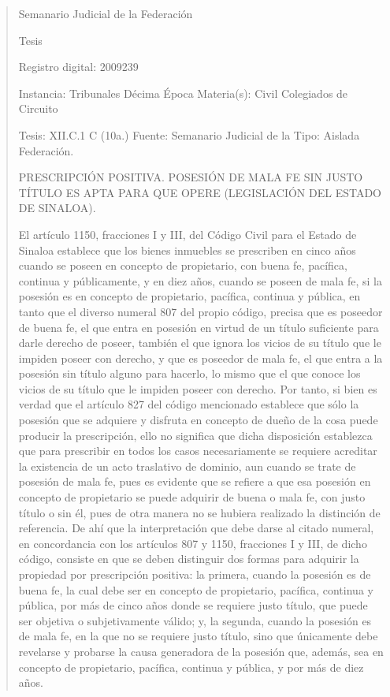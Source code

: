 \documentclass[11pt,a4paper]{article}
\begin{document}
\begin{quote}
                                                   Semanario Judicial de la Federación

                                               Tesis

 Registro digital: 2009239

 Instancia: Tribunales             Décima Época                          Materia(s): Civil
 Colegiados de Circuito

 Tesis: XII.C.1 C (10a.)           Fuente: Semanario Judicial de la      Tipo: Aislada
                                   Federación.


PRESCRIPCIÓN POSITIVA. POSESIÓN DE MALA FE SIN JUSTO TÍTULO ES APTA PARA QUE
OPERE (LEGISLACIÓN DEL ESTADO DE SINALOA).


El artículo 1150, fracciones I y III, del Código Civil para el Estado de Sinaloa establece que los
bienes inmuebles se prescriben en cinco años cuando se poseen en concepto de propietario, con
buena fe, pacífica, continua y públicamente, y en diez años, cuando se poseen de mala fe, si la
posesión es en concepto de propietario, pacífica, continua y pública, en tanto que el diverso numeral
807 del propio código, precisa que es poseedor de buena fe, el que entra en posesión en virtud de
un título suficiente para darle derecho de poseer, también el que ignora los vicios de su título que le
impiden poseer con derecho, y que es poseedor de mala fe, el que entra a la posesión sin título
alguno para hacerlo, lo mismo que el que conoce los vicios de su título que le impiden poseer con
derecho. Por tanto, si bien es verdad que el artículo 827 del código mencionado establece que sólo
la posesión que se adquiere y disfruta en concepto de dueño de la cosa puede producir la
prescripción, ello no significa que dicha disposición establezca que para prescribir en todos los
casos necesariamente se requiere acreditar la existencia de un acto traslativo de dominio, aun
cuando se trate de posesión de mala fe, pues es evidente que se refiere a que esa posesión en
concepto de propietario se puede adquirir de buena o mala fe, con justo título o sin él, pues de otra
manera no se hubiera realizado la distinción de referencia. De ahí que la interpretación que debe
darse al citado numeral, en concordancia con los artículos 807 y 1150, fracciones I y III, de dicho
código, consiste en que se deben distinguir dos formas para adquirir la propiedad por prescripción
positiva: la primera, cuando la posesión es de buena fe, la cual debe ser en concepto de propietario,
pacífica, continua y pública, por más de cinco años donde se requiere justo título, que puede ser
objetiva o subjetivamente válido; y, la segunda, cuando la posesión es de mala fe, en la que no se
requiere justo título, sino que únicamente debe revelarse y probarse la causa generadora de la
posesión que, además, sea en concepto de propietario, pacífica, continua y pública, y por más de
diez años.


\end{quote}
\end{document}
